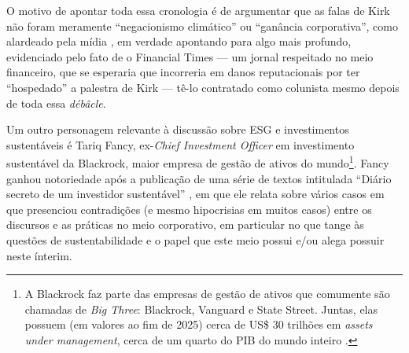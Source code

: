\documentclass[12pt]{article}
\numberwithin{equation}{section}
\theoremstyle{plain}
\theoremstyle{definition}
\theoremstyle{remark}
\begin{document}
O motivo de apontar toda essa cronologia é de argumentar que as falas de Kirk não foram meramente ``negacionismo climático'' ou ``ganância corporativa'', como alardeado pela mídia \parencite{Gross2022,Makortoff2022,BBC2022}, em verdade apontando para algo mais profundo, evidenciado pelo fato de o Financial Times --- um jornal respeitado no meio financeiro, que se esperaria que incorreria em danos reputacionais por ter ``hospedado'' a palestra de Kirk --- tê-lo contratado como colunista mesmo depois de toda essa \textit{débâcle}. %





Um outro personagem relevante à discussão sobre ESG e investimentos sustentáveis é Tariq Fancy, ex-\textit{Chief Investment Officer} em investimento sustentável da Blackrock, maior empresa de gestão de ativos do mundo\footnote{A Blackrock faz parte das empresas de gestão de ativos que comumente são chamadas de \textit{Big Three}: Blackrock, Vanguard e State Street. Juntas, elas possuem (em valores ao fim de 2025) cerca de US\$ 30 trilhões em \textit{assets under management}, cerca de um quarto do PIB do mundo inteiro \parencite{Finance2026,WorldBankGDP}.}. Fancy ganhou notoriedade após a publicação de uma série de textos intitulada ``Diário secreto de um investidor sustentável'' \parencite{Fancy2021}, em que ele relata sobre vários casos em que presenciou contradições (e mesmo hipocrisias em muitos casos) entre os discursos e as práticas no meio corporativo, em particular no que tange às questões de sustentabilidade e o papel que este meio possui e/ou alega possuir neste ínterim.
\end{document}
